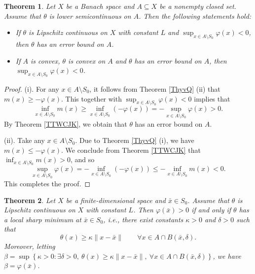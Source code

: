 \documentclass[11pt]{article}
\newtheorem{theorem}{Theorem}[section]
\begin{document}
\begin{theorem}  \label{TVhCJK}  Let $X$   be a Banach space  and $A \subseteq X$ be a nonempty closed   set. Assume that $\theta$ is lower semicontinuous on $A$. Then the following statements hold:
	\begin{itemize}
		\item[(i)]   If  $\theta$ is   Lipschitz continuous on $X$ with constant $L$ and 	$ \sup_{x \in A \setminus S_0} \varphi(x) < 0 $, then $\theta$ has an error bound on $A$.
		\item[(ii)] 	If $A$ is convex,  $\theta$ is convex on $A$ and $\theta$ has an error bound on $A$, then $ \sup_{x \in A \setminus S_0} \varphi(x) < 0 $.
	\end{itemize}
\end{theorem}
\begin{proof}    (i).      For  any   \(x\in A\setminus S_0\),    it follows from  Theorem    \ref{ThyvQ}  (ii)  that  \(m(x)\ge -\varphi(x)\).   This together with  $ \sup_{x \in A \setminus S_0} \varphi(x) < 0 $  implies that 
	$$    \inf_{x \in A \setminus S_0} m (x)   \geq  \inf_{x \in A \setminus S_0}    (- \varphi(x)  )      =     -  \sup_{x \in A \setminus S_0} \varphi(x) > 0  .$$
	By Theorem    \ref{TTWCJK},  we obtain that  $\theta$ has an error bound on $A$.
	
	(ii).    Take any \(x\in A\setminus S_0\).   Due to Theorem    \ref{ThyvQ}  (i), we have  \(m(x)\le -\varphi(x)\).   We conclude from  Theorem    \ref{TTWCJK}  that  $\inf_{x \in A \setminus S_0} m (x) >0$,  and so
	$$
	\sup_{x \in A \setminus S_0} \varphi(x) = -  \inf_{x \in A \setminus S_0}    (- \varphi(x)  )  \leq -  \inf_{x \in A \setminus S_0}  m (x)  < 0.
	$$   This completes the proof. 
\end{proof} 




\begin{theorem} \label{TRgfd} 
	Let $X$ be a  finite-dimensional   space and  $\bar{x} \in S_0$.    Assume that $\theta$ is   Lipschitz continuous on $X$ with constant $L$.    Then  $	\varphi (\bar x) > 0$ if and only if  	$\theta$ has a local sharp minimum at   $\bar x\in S_0$,	i.e., there exist constants $\kappa > 0$ and $\delta > 0$ such that
	\[
	\theta(x) \ge \kappa \|x - \bar x\| \qquad \forall x \in A \cap B(\bar x, \delta).
	\]
	Moreover, letting $\beta = \sup \left\{ \kappa > 0 : \exists \delta > 0,\ \theta(x) \ge \kappa \|x - \bar x\|,\ \forall x \in A \cap B(\bar x, \delta) \right\}$, we have $\beta = \varphi (\bar x)$.
\end{theorem}
\end{document}
